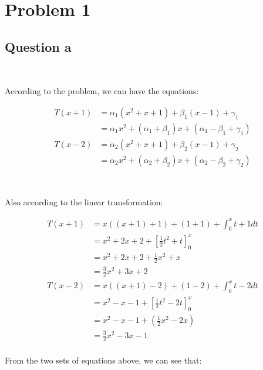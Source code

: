 \documentclass{article}
\begin{document}
\section{Problem 1}

\subsection{Question a}

~

According to the problem, we can have the equations:

\begin{equation*}
\begin{split}
T(x+1)&=\alpha_1 (x^2+x+1)+\beta_1 (x-1)+\gamma_1\\
&=\alpha_1 x^2+(\alpha_1+\beta_1)x+(\alpha_1-\beta_1+\gamma_1)\\
T(x-2)&=\alpha_2 (x^2+x+1)+\beta_2 (x-1)+\gamma_2\\
&=\alpha_2 x^2+(\alpha_2+\beta_2)x+(\alpha_2-\beta_2+\gamma_2)
\end{split}
\end{equation*}

~

Also according to the linear transformation:

\begin{equation*}
\begin{split}
T(x+1)&=x((x+1)+1)+(1+1)+\int^x_0 t+1 dt\\
&=x^2+2x+2+\left[\frac{1}{2}t^2+t\right]^x_0\\
&=x^2+2x+2+\frac{1}{2}x^2+x\\
&=\frac{3}{2}x^2+3x+2\\
T(x-2)&=x((x+1)-2)+(1-2)+\int^x_0 t-2 dt\\
&=x^2-x-1+\left[\frac{1}{2}t^2-2t\right]^x_0\\
&=x^2-x-1+(\frac{1}{2}x^2-2x)\\
&=\frac{3}{2}x^2-3x-1\\
\end{split}
\end{equation*}

From the two sets of equations above, we can see that:
\end{document}
